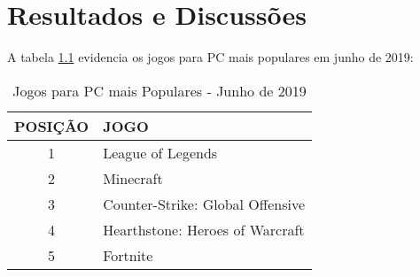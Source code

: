 \chapter{Resultados e Discussões}

\lipsum[1-2]

A tabela \ref{tab:newzoo} evidencia os jogos para PC mais populares em junho de 2019:

\begin{table}[h!] 
\caption{Jogos para PC mais Populares - Junho de 2019} 
\label{tab:newzoo}
	\begin{center} 
		\begin{tabular}{|c|l|} 
			\hline POSIÇÃO & JOGO \\
			\hline
			\hline 1 & League of Legends \\ 
			\hline 2 & Minecraft \\ 
			\hline 3 & Counter-Strike: Global Offensive \\
			\hline 4 & Hearthstone: Heroes of Warcraft \\
			\hline 5 & Fortnite \\						
			\hline
		\end{tabular} 
	\end{center}
\end{table}

\lipsum[3-5]